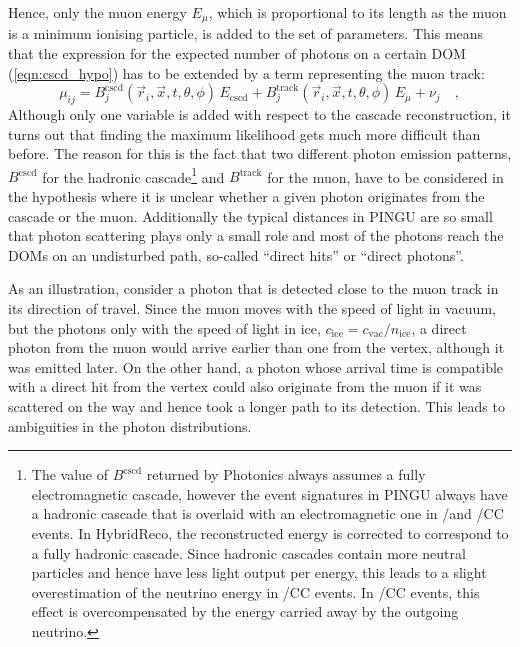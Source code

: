 Hence, only the muon energy $E_\mu$, which is proportional to its length as 
the muon is a minimum ionising particle, is added to the set of parameters.
This means that the expression for the expected number of photons on a certain
DOM (\ref{eqn:cscd_hypo}) has to be extended by a term representing the muon
track:
\begin{equation}
  \mu_{ij} = B^\mathrm{cscd}_j(\vec{r}_i, \vec{x}, t, \theta,\phi)
              \,E_\mathrm{cscd}
   + B^\mathrm{track}_j(\vec{r}_i, \vec{x}, t, \theta, \phi)\,E_\mu
   + \nu_j \quad, \label{eqn:hybrid_hypo}
\end{equation}
Although only one variable is added with respect to the cascade reconstruction,
it turns out that finding the maximum likelihood gets much more difficult than
before. The reason for this is the fact that two different photon emission
patterns, $B^\mathrm{cscd}$ for the hadronic cascade\footnote{The value of
$B^\mathrm{cscd}$ returned by Photonics always assumes a fully electromagnetic
cascade, however the event signatures in PINGU always have a hadronic cascade
that is overlaid with an electromagnetic one in \nue/\nuebar and
\nutau/\nutaubar CC events. In HybridReco, the reconstructed energy is
corrected to correspond to a fully hadronic cascade. Since hadronic cascades
contain more neutral particles and hence have less light output per energy,
this leads to a slight overestimation of the neutrino energy in \nue/\nuebar CC
events. In \nutau/\nutaubar CC events, this effect is overcompensated by the
energy carried away by the outgoing neutrino.} and $B^\mathrm{track}$ for
the muon, have to be considered in the hypothesis where it is unclear whether a
given photon originates from the cascade or the muon. Additionally the typical
distances in PINGU are so small that photon scattering plays only a small role
and most of the photons reach the DOMs on an undisturbed path, so-called
``direct hits'' or ``direct photons''.

As an illustration, consider a photon that is detected close to the muon track
in its direction of travel. Since the muon moves with the speed of light in
vacuum, but the photons only with the speed of light in ice, $c_\mathrm{ice} =
c_\mathrm{vac}/n_\mathrm{ice}$, a direct photon from the muon would arrive
earlier than one from the vertex, although it was emitted later. On the other
hand, a photon whose arrival time is compatible with a direct hit from the
vertex could also originate from the muon if it was scattered on the way and
hence took a longer path to its detection. This leads to ambiguities in the
photon distributions.

